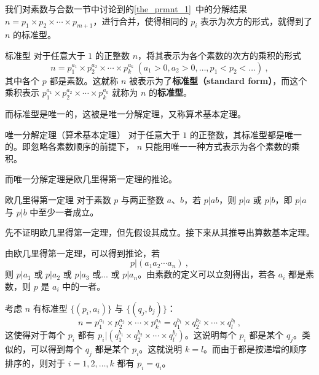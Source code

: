 
我们对素数与合数一节中讨论到的\autoref{the_prmnt_1}~中的分解结果 $n = p_1 \times p_2\times \cdots \times p_{m+1}$，进行合并，使得相同的 $p_i$ 表示为次方的形式，就得到了 $n$ 的标准型。
\begin{definition}{标准型}
对于任意大于 $1$ 的正整数 $n$，将其表示为各个素数的次方的乘积的形式
\begin{equation}
n = p_1^{a_1} \times p_2^{a_2} \times \cdots \times p_k^{a_k} ~ (a_1 > 0, a_2 > 0 , \dots, p_1 < p_2<\dots) ~,
\end{equation}
其中各个 $p$ 都是素数。这就称 $n$ 被表示为了\textbf{标准型（standard form）}，而这个乘积表示 $p_1^{a_1} \times p_2^{a_2} \times \cdots \times p_k^{a_k}$ 就称为 $n$ 的\textbf{标准型}。
\end{definition}

而标准型是唯一的，这被是唯一分解定理，又称算术基本定理。
\begin{theorem}{唯一分解定理（算术基本定理）}
对于任意大于 $1$ 的正整数，其标准型都是唯一的。即忽略各素数顺序的前提下， $n$ 只能用唯一一种方式表示为各个素数的乘积。
\end{theorem}

而唯一分解定理是欧几里得第一定理的推论。
\begin{theorem}{欧几里得第一定理}
对于素数 $p$ 与两正整数 $a$、$b$，若 $p|ab$，则 $p|a$ 或 $p|b$，即 $p|a$ 与 $p|b$ 中至少一者成立。
\end{theorem}

先不证明欧几里得第一定理，但先假设其成立。接下来从其推导出算数基本定理。

由欧几里得第一定理，可以得到推论，若
\begin{equation}
p | (a_1 a_2 \cdots a_n) ~,
\end{equation}
则 $p | a_1$ 或 $p | a_2$ 或 $p|a_3$ 或... 或 $p|a_n$。由素数的定义可以立刻得出，若各 $a_i$ 都是素数，则 $p$ 是 $a_i$ 中的一者。

考虑 $n$ 有标准型 $\{(p_i, a_i)\}$ 与  $\{(q_j, b_j)\}$：
\begin{equation}
n = p_1^{a_1}\times p_2^{a_2} \times \cdots \times p_k^{a_k} = q_1^{b_1} \times q_2^{b_2} \times \cdots \times q_l^{b_l} ~,
\end{equation}
这使得对于每个 $p_i$ 都有 $p_i | (q_1^{b_1} \times q_2^{b_2} \times \cdots \times q_l^{b_l})$。这说明每个 $p_i$ 都是某个 $q_j$。类似的，可以得到每个 $q_j$ 都是某个 $p_i$。这就说明 $k = l$。而由于都是按递增的顺序排序的，则对于 $i = 1,2,\dots, k$ 都有 $p_i = q_i$。

